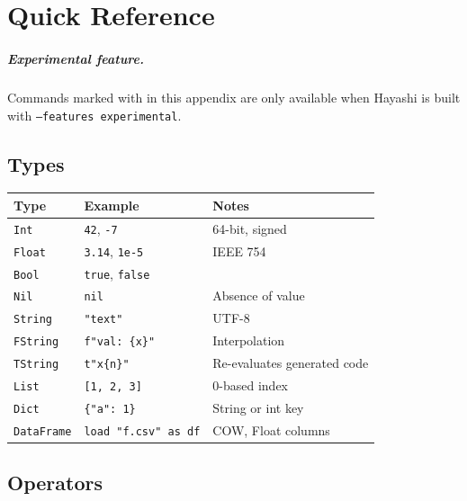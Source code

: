 \chapter{Quick Reference}
\label{apendice:referencia}

\paragraph*{Experimental feature.} Commands marked with \textdagger{} in this
appendix are only available when Hayashi is built with
\texttt{--features experimental}.


\section{Types}

\begin{center}
\begin{tabular}{lll}
\toprule
\textbf{Type} & \textbf{Example} & \textbf{Notes} \\
\midrule
\texttt{Int}       & \texttt{42}, \texttt{-7}      & 64-bit, signed \\
\texttt{Float}     & \texttt{3.14}, \texttt{1e-5}  & IEEE 754 \\
\texttt{Bool}      & \texttt{true}, \texttt{false} & \\
\texttt{Nil}       & \texttt{nil}                  & Absence of value \\
\texttt{String}    & \texttt{"text"}               & UTF-8 \\
\texttt{FString}   & \texttt{f"val: \{x\}"}        & Interpolation \\
\texttt{TString}   & \texttt{t"x\{n\}"}             & Re-evaluates generated code \\
\texttt{List}      & \texttt{[1, 2, 3]}            & 0-based index \\
\texttt{Dict}      & \texttt{\{"a": 1\}}           & String or int key \\
\texttt{DataFrame} & \texttt{load "f.csv" as df}   & COW, Float columns \\
\bottomrule
\end{tabular}
\end{center}

\section{Operators}

